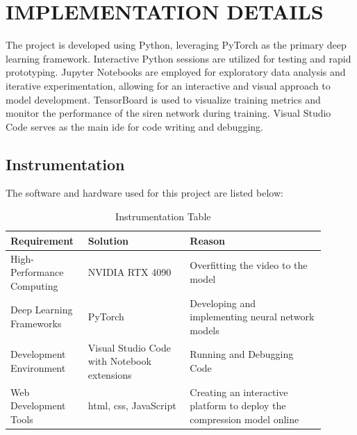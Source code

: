 \documentclass{ioereport}
\begin{document}
    \pagebreak

\section{\MakeUppercase{Implementation Details}}
The project is developed using Python, leveraging PyTorch as the primary deep learning framework. Interactive Python sessions are utilized for testing and rapid prototyping. Jupyter Notebooks are employed for exploratory data analysis and iterative experimentation, allowing for an interactive and visual approach to model development. TensorBoard is used to visualize training metrics and monitor the performance of the \gls{siren} network during training. Visual Studio Code serves as the main \gls{ide} for code writing and debugging.

\subsection{Instrumentation}
    The software and hardware used for this project are listed below:
    \begin{table}[H]
        \caption{Instrumentation Table}
        \label{table:instrumentation-table}
        \centering
        \begin{tabular}{|L{0.2\linewidth}|L{0.3\linewidth}|L{0.4\linewidth}|}
            \hline
            \textbf{Requirement} & \textbf{Solution} & \textbf{Reason} \\
            \hline
            High-Performance Computing & NVIDIA RTX 4090 & Overfitting the video to the model \\
            \hline
            Deep Learning Frameworks & PyTorch &
            Developing and implementing neural network models \\
            \hline
            Development Environment & Visual Studio Code with Notebook extensions & Running and Debugging Code\\
            \hline
            Web Development Tools & \gls{html}, \gls{css}, JavaScript & Creating an interactive platform to deploy the compression model online \\
            \hline
        \end{tabular}
    \end{table}
    
\end{document}
